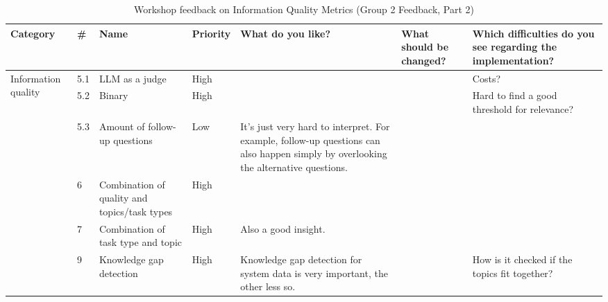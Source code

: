 \documentclass[
	english,
	ruledheaders=section,%
	class=report,%
	thesis={type=bachelor},%
	accentcolor=1b,%
	custommargins=true,%
	marginpar=false,%
	parskip=half-,%
	fontsize=11pt,%
	DIV=14,
]{tudapub}
\begin{document}
\begin{table}
    \centering
    \small 
    \caption{Workshop feedback on Information Quality Metrics (Group 2 Feedback, Part 2)}
    \label{tab:info_quality_g2_p2}
    \begin{tabularx}{\textheight}{p{2.2cm} l >{\RaggedRight\arraybackslash}X l >{\RaggedRight\arraybackslash}X >{\RaggedRight\arraybackslash}X >{\RaggedRight\arraybackslash}X}
        \toprule
        \textbf{Category} & \textbf{\#} & \textbf{Name} & \textbf{Priority} & \textbf{What do you like?} & \textbf{What should be changed?} & \textbf{Which difficulties do you see regarding the implementation?} \\
        \midrule

        \multirow{6}{=}{Information quality} 
        & 5.1 & LLM as a judge & High & & & Costs? \\
        \cmidrule(l){2-7}
        & 5.2 & Binary & High & & & Hard to find a good threshold for relevance? \\
        \cmidrule(l){2-7}
        & 5.3 & Amount of follow-up questions & Low & It's just very hard to interpret. For example, follow-up questions can also happen simply by overlooking the alternative questions. & & \\
        \cmidrule(l){2-7}
        & 6 & Combination of quality and topics/task types & High & & & \\
        \cmidrule(l){2-7}
        & 7 & Combination of task type and topic & High & Also a good insight. & & \\
        \cmidrule(l){2-7}
        & 9 & Knowledge gap detection & High & Knowledge gap detection for system data is very important, the other less so. & & How is it checked if the topics fit together? \\
        \bottomrule
    \end{tabularx}
\end{table}
\end{document}
